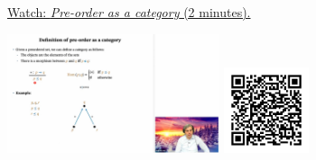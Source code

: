 
\begin{minipage}{10cm}
    \href{https://act4e-spring21.netlify.app/videos/spring2021-tradeoffs:tradeoffs:orders:preorder-as-cat.html}{Watch: \emph{Pre-order as a category} (2 minutes).}
        
    \href{https://act4e-spring21.netlify.app/videos/spring2021-tradeoffs:tradeoffs:orders:preorder-as-cat.html}{\includegraphics[height=3.5cm]{spring2021-tradeoffs:tradeoffs:orders:preorder-as-cat/thumbnails.jpg}}
    \href{https://act4e-spring21.netlify.app/videos/spring2021-tradeoffs:tradeoffs:orders:preorder-as-cat.html}{\includegraphics[height=2.5cm]{spring2021-tradeoffs:tradeoffs:orders:preorder-as-cat/qrcode.png}}
\end{minipage}
